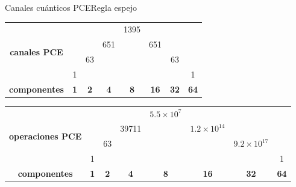\documentclass[xcolor=dvipsnames,presentation]{beamer}%
\begin{document}
\begin{frame}{Canales cuánticos PCE}{Regla espejo}
\begin{table}[]
\begin{table}[]
\footnotesize
\begin{tabular}{cccccccc}
\multirow{4}{*}{\textbf{canales PCE}} &            &            &            & 1395       &             &             &             \\
                                                      &            &            & 651        &            & 651         &             &             \\
                                                      &            & 63         &            &            &             & 63          &             \\
                                                      & 1          &            &            &            &             &             & 1           \\
\textbf{componentes}                                  & \textbf{1} & \textbf{2} & \textbf{4} & \textbf{8} & \textbf{16} & \textbf{32} & \textbf{64}
\end{tabular}
\end{table}
\end{table} 

\begin{table}[]
\footnotesize
\begin{tabular}{cccccccc}
\multirow{4}{*}{\textbf{operaciones PCE}} &            &            &            & $5.5\times 10^7$ &                     &                         &             \\
                                          &            &            & 39711      &             & $1.2\times 10^{14}$ &                         &             \\
                                          &            & 63         &            &             &                     & $9.2\times 10^{17}$ &             \\
                                          & 1          &            &            &             &                     &                         & 1           \\
\textbf{componentes}                      & \textbf{1} & \textbf{2} & \textbf{4} & \textbf{8}  & \textbf{16}         & \textbf{32}             & \textbf{64}
\end{tabular}
\end{table}

\end{frame}
\end{document}
